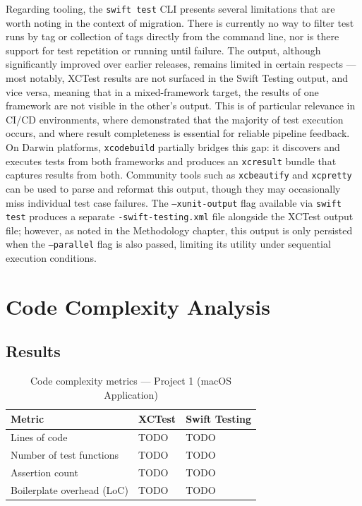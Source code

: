 Regarding tooling, the \texttt{swift test} CLI presents several limitations that
are worth noting in the context of migration. There is currently no way to filter
test runs by tag or collection of tags directly from the command line, nor is there
support for test repetition or running until failure. The output, although significantly
improved over earlier releases, remains limited in certain respects --- most notably,
XCTest results are not surfaced in the Swift Testing output, and vice versa, meaning
that in a mixed-framework target, the results of one framework are not visible in the
other's output. This is of particular relevance in CI/CD environments, where
\cite{beller2015} demonstrated that the majority of test execution occurs, and where
result completeness is essential for reliable pipeline feedback. On Darwin platforms,
\texttt{xcodebuild} partially bridges this gap: it discovers and executes tests from
both frameworks and produces an \texttt{xcresult} bundle that captures results from
both. Community tools such as \texttt{xcbeautify} and \texttt{xcpretty} can be used
to parse and reformat this output, though they may occasionally miss individual test
case failures. The \texttt{--xunit-output} flag available via \texttt{swift test}
produces a separate \texttt{-swift-testing.xml} file alongside the XCTest output
file; however, as noted in the Methodology chapter, this output is only persisted
when the \texttt{--parallel} flag is also passed, limiting its utility under
sequential execution conditions.

\section{Code Complexity Analysis}

\subsection{Results}


\begin{table}[ht]
    \centering
    \caption{Code complexity metrics --- Project 1 (macOS Application)}
    \label{tab:complexity-project1}
    \begin{tabular}{lll}
        \hline
        \textbf{Metric}            & \textbf{XCTest} & \textbf{Swift Testing} \\
        \hline
        Lines of code              & TODO            & TODO                   \\
        Number of test functions   & TODO            & TODO                   \\
        Assertion count            & TODO            & TODO                   \\
        Boilerplate overhead (LoC) & TODO            & TODO                   \\
        \hline
    \end{tabular}
\end{table}

